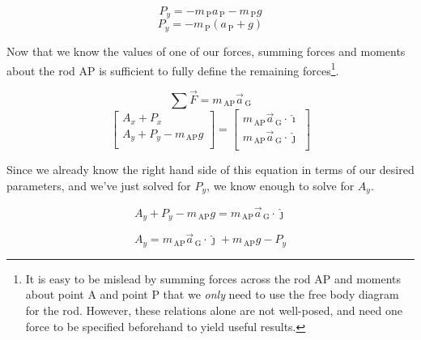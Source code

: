 \documentclass[nofoot,pdf-a,balance,colorlinks,upint,subscriptcorrection,varvw,mathalfa=cal=boondoxo]{asmeconf}
\begin{document}
    \begin{equation}
        P_y = -m_{\,\textrm{P}}a_{\,\textrm{P}} -  m_{\,\textrm{P}}g
    \end{equation}
    \begin{equation}
        P_y = -m_{\,\textrm{P}}\left(a_{\,\textrm{P}} +  g\right)
    \end{equation}

    

    Now that we know the values of one of our forces, summing forces and moments about the rod AP is sufficient to fully define the remaining forces\footnote{It is easy to be mislead by summing forces across the rod AP and moments about point A and point P that we \textit{only} need to use the free body diagram for the rod. However, these relations alone are not well-posed, and need one force to be specified beforehand to yield useful results.}.

    \begin{equation}
        \sum{\vec{F}} = m_{\,\textrm{AP}}\vec{a}_{\,\textrm{G}}
    \end{equation}
    \begin{equation}
        \begin{bmatrix}
            A_x + P_x \\
            A_y + P_y - m_{\,\textrm{AP}}g \\
        \end{bmatrix} = 
        \begin{bmatrix}
            m_{\,\textrm{AP}}\vec{a}_{\,\textrm{G}} \cdot \hat{\imath} \\
            m_{\,\textrm{AP}}\vec{a}_{\,\textrm{G}} \cdot \hat{\jmath} \\
        \end{bmatrix}
    \end{equation}

    Since we already know the right hand side of this equation in terms of our desired parameters, and we've just solved for $P_y$, we know enough to solve for $A_y$.

    \begin{equation} 
        A_y + P_y - m_{\,\textrm{AP}}g  = m_{\,\textrm{AP}}\vec{a}_{\,\textrm{G}} \cdot \hat{\jmath}
    \end{equation}
    
    \begin{equation} 
        A_y = m_{\,\textrm{AP}}\vec{a}_{\,\textrm{G}} \cdot \hat{\jmath} +  m_{\,\textrm{AP}}g - P_y
    \end{equation}
\end{document}
